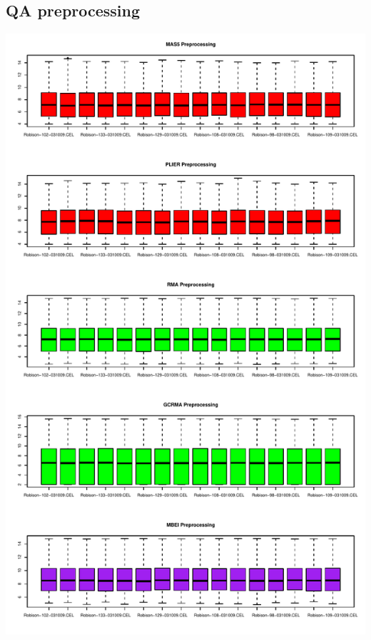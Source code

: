 \documentclass[pdf]{beamer}
\begin{document}
\subsection{QA preprocessing}
\begin{frame}
\begin{center}
  \includegraphics[scale=0.4]{figures/normboxplots.pdf} 
\end{center}
\end{frame}
\end{document}
